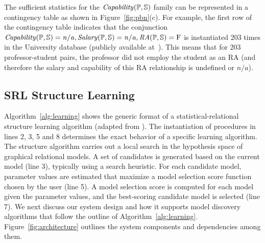 \documentclass{IEEEtran}
\begin{document}
The sufficient statistics for the $\it{Capability}(\P,\S)$ family can be represented in a contingency table as shown in Figure~\ref{fig:pbn}(c). For example, the first row of the contingency table indicates that the conjunction \\$\it{Capability}(\P,\S)=n/a,\it{Salary}(\P,\S)=n/a,\it{RA}(\P,\S) =\false$ is instantiated 203 times in the University database (publicly available at~\cite{bib:bbsite}). This means that for 203 professor-student pairs, the professor did not employ the student as an RA (and therefore the salary and capability of this RA relationship is undefined or $n/a$).

\subsection{SRL Structure Learning}

Algorithm~\ref{alg:learning} shows the generic format of a statistical-relational structure learning algorithm (adapted from 
\cite{Kimmig2015}%
). The instantiation of procedures in lines 2, 3, 5 and 8 determines the exact behavior of a specific learning algorithm. The structure algorithm carries out a local search in the hypothesis space of graphical relational models. A set of candidates is generated based on the current model (line 3), typically using a search heuristic. For each candidate model, parameter values are estimated that maximize a model selection score function chosen by the  user (line 5). A model selection score is computed for each model given the parameter values, and the best-scoring candidate model is selected (line 7). 
We next discuss our system design and how it supports model discovery algorithms that follow the outline of Algorithm~\ref{alg:learning}. Figure~\ref{fig:architecture} outlines the system components and dependencies among them.
\end{document}
